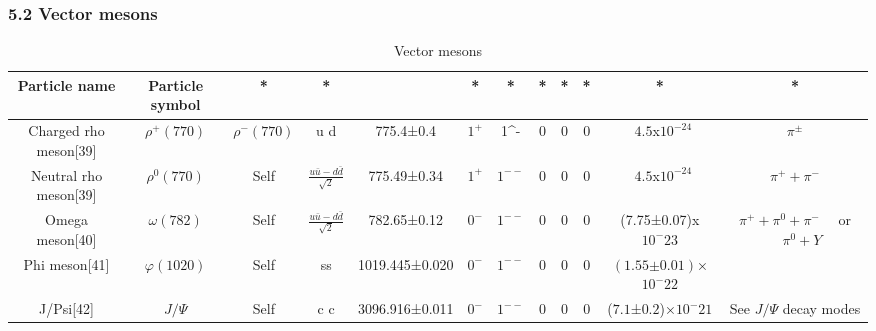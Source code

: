 \subsubsection{5.2 Vector mesons}
\begin{table}[ht]
\centering
\caption{Vector mesons}\label{tab_JZ6}
\begin{tabular}{|c|c|c|c|c|c|c|c|c|c|c|c|}
\hline
Particle name & Particle
symbol & * & * & & * & * & * & * & * & * & * \\
\hline
Charged rho meson[39] & $\rho^+(770)$ & $\rho^-(770)$ & u d &  775.4±0.4   & $1^+$ & 1^- & 0 &0 & 0 & ~$4.5$x$10^{-24}$ & $\pi^\pm$ \\
\hline
Neutral rho meson[39] & $\rho^0(770)$ & Self & $\frac{u\bar u-d\bar d}{\sqrt{2}}$ & 775.49±0.34  & $1^+$ & $1^{--}$ & 0 & 0 & 0 & ~$4.5$x$10^{-24}$ & $\pi^+ +\pi^-$ \\
\hline
Omega meson[40] &  $\omega(782)$&Self &  $\frac{u\bar u-d\bar d}{\sqrt{2}}$& 782.65±0.12  & $0^-$ & $1^{--}$ & 0 & 0 &0 &(7.75±0.07)x$10^-{23}$& $\pi^+ +\pi^0 +\pi^-  \quad$ or$\quad \pi^0+Y$\\
\hline
Phi meson[41] & $\varphi(1020)$ & Self & ss &  1019.445±0.020&  $0^-$ & $1^{--}$  & 0 & 0 & 0& $(1.55\text{±}0.01)$×$10^-22$ &  \\
\hline
J/Psi[42] & $J/\Psi$ & Self & c c &  3096.916±0.011 & $0^-$ & $1^{--}$  & 0 & 0 & 0 & ($7.1$±$0.2$)×$10^-21$ & See $J/\Psi$  decay modes\\
\hline



\end{tabular}
\end{table}
